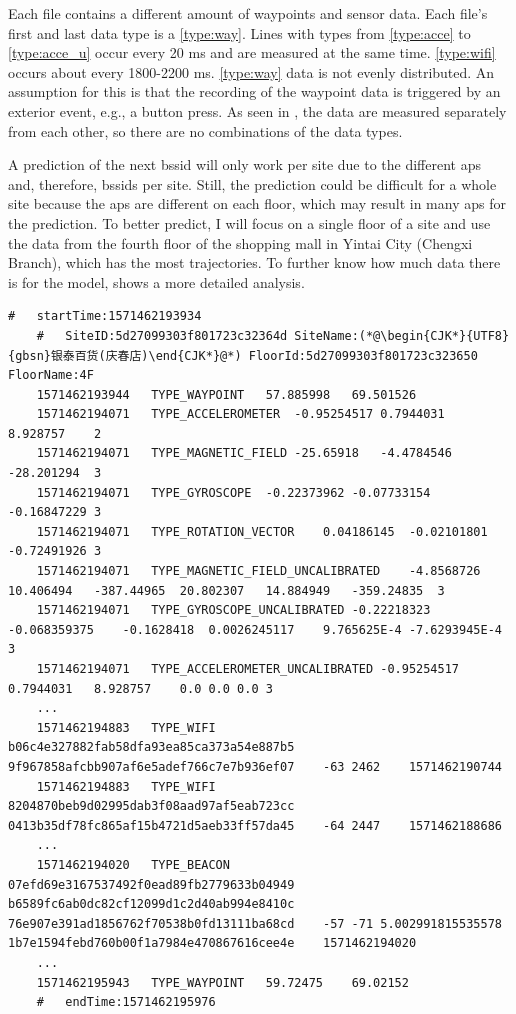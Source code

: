 Each file contains a different amount of waypoints and sensor data.
Each file's first and last data type is a \ref{type:way}.
Lines with types from \ref{type:acce} to \ref{type:acce_u} occur every 20 ms and are measured at the same time.
\ref{type:wifi} occurs about every 1800-2200 ms.
\ref{type:way} data is not evenly distributed.
An assumption for this is that the recording of the waypoint data is triggered by an exterior event, e.g., a button press.
As seen in , the data are measured separately from each other, so there are no combinations of the data types.

A prediction of the next \ac{bssid} will only work per site due to the different \acp{ap} and, therefore, \acp{bssid} per site.
Still, the prediction could be difficult for a whole site because the \acp{ap} are different on each floor, which may result in many \acp{ap} for the prediction.
To better predict, I will focus on a single floor of a site and use the data from the fourth floor of the shopping mall in Yintai City (Chengxi Branch), which has the most trajectories.
To further know how much data there is for the model,  shows a more detailed analysis.


\begin{lstlisting}[caption={A snippet from the dataset of the file 5daa9e38df065a00069beb79.txt of the floor F4},label={lst:dataset}]
    #   startTime:1571462193934
    #   SiteID:5d27099303f801723c32364d SiteName:(*@\begin{CJK*}{UTF8}{gbsn}银泰百货(庆春店)\end{CJK*}@*) FloorId:5d27099303f801723c323650 FloorName:4F
    1571462193944   TYPE_WAYPOINT   57.885998   69.501526
    1571462194071   TYPE_ACCELEROMETER  -0.95254517 0.7944031   8.928757    2
    1571462194071   TYPE_MAGNETIC_FIELD -25.65918   -4.4784546  -28.201294  3
    1571462194071   TYPE_GYROSCOPE  -0.22373962 -0.07733154 -0.16847229 3
    1571462194071   TYPE_ROTATION_VECTOR    0.04186145  -0.02101801 -0.72491926 3
    1571462194071   TYPE_MAGNETIC_FIELD_UNCALIBRATED    -4.8568726  10.406494   -387.44965  20.802307   14.884949   -359.24835  3
    1571462194071   TYPE_GYROSCOPE_UNCALIBRATED -0.22218323 -0.068359375    -0.1628418  0.0026245117    9.765625E-4 -7.6293945E-4   3
    1571462194071   TYPE_ACCELEROMETER_UNCALIBRATED -0.95254517 0.7944031   8.928757    0.0 0.0 0.0 3
    ...
    1571462194883   TYPE_WIFI   b06c4e327882fab58dfa93ea85ca373a54e887b5    9f967858afcbb907af6e5adef766c7e7b936ef07    -63 2462    1571462190744
    1571462194883   TYPE_WIFI   8204870beb9d02995dab3f08aad97af5eab723cc    0413b35df78fc865af15b4721d5aeb33ff57da45    -64 2447    1571462188686
    ...
    1571462194020   TYPE_BEACON 07efd69e3167537492f0ead89fb2779633b04949    b6589fc6ab0dc82cf12099d1c2d40ab994e8410c    76e907e391ad1856762f70538b0fd13111ba68cd    -57 -71 5.002991815535578   1b7e1594febd760b00f1a7984e470867616cee4e    1571462194020
    ...
    1571462195943   TYPE_WAYPOINT   59.72475    69.02152
    #   endTime:1571462195976
\end{lstlisting}

